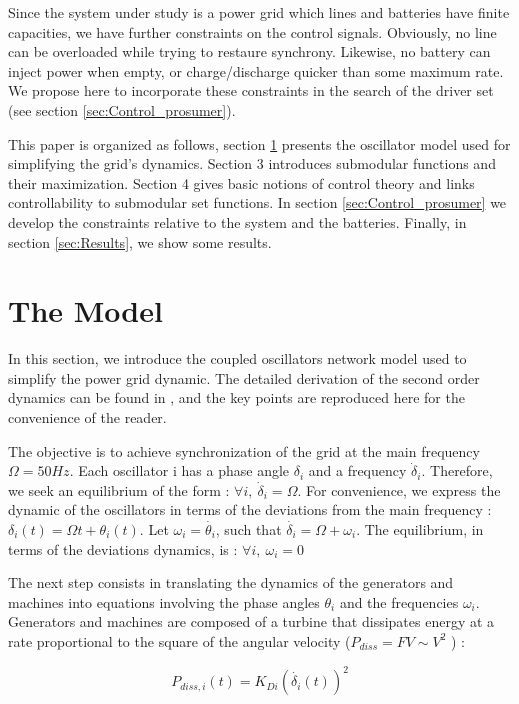 \documentclass[conference]{IEEEtran}
\begin{document}
Since the system under study is a power grid which lines and batteries have finite capacities, we have further constraints on the control signals. Obviously, no line can be overloaded while trying to restaure synchrony. Likewise, no battery can inject power when empty, or charge/discharge quicker than some maximum rate. We propose here to incorporate these constraints in the search of the driver set (see section \ref{sec:Control_prosumer}).

This paper is organized as follows, section \ref{sec:The_Model} presents the oscillator model used for simplifying the grid's dynamics. Section 3 introduces submodular functions and their maximization. Section 4 gives basic notions of control theory and links controllability to submodular set functions. In section \ref{sec:Control_prosumer} we develop the constraints relative to the system and the batteries. Finally, in section \ref{sec:Results}, we show some results.


\section{The Model}
\label{sec:The_Model}

In this section, we introduce the coupled oscillators network model used to simplify the power grid dynamic. The detailed derivation of the second order dynamics can be found in \cite{Filatrella2008}, and the key points are reproduced here for the convenience of the reader.

 The objective is to achieve synchronization of the grid at the main frequency $ \Omega = 50 Hz $. Each oscillator i has a phase angle $ \delta_i $ and a frequency $ \dot{\delta}_i $. Therefore, we seek an equilibrium of the form : $ \forall i,\ \dot{\delta}_i = \Omega $. For convenience, we express the dynamic of the oscillators in terms of the deviations from the main frequency : $ \delta_i(t) = \Omega t + \theta_i(t) $. Let $ \omega_i = \dot{\theta_i} $, such that $ \dot{\delta_i} = \Omega + \omega_i $. The equilibrium, in terms of the deviations dynamics, is : $ \forall i,\ \omega_i = 0 $

The next step consists in translating the dynamics of the generators and machines into equations involving the phase angles $ \theta_i $ and the frequencies $ \omega_i$. Generators and machines are composed of a turbine that dissipates energy at a rate proportional to the square of the angular velocity ($P_{diss} = FV \sim V^2 $ ) : 

\begin{equation}
  P_{diss, i}(t) = K_{Di}(\dot{\delta_i}(t))^2 
\end{equation}
\end{document}
